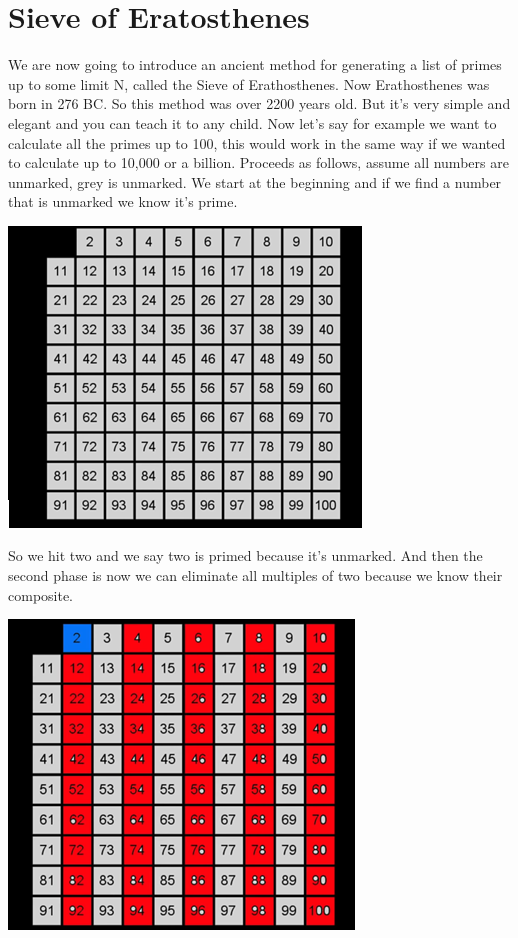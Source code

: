 \documentclass{report}
\begin{document}
\section{Sieve of Eratosthenes}
We are now going to introduce an ancient method for generating a list of primes up to some limit N, called the Sieve of Erathosthenes. Now Erathosthenes was born in 276 BC. So this method was over 2200 years old. But it's very simple and elegant and you can teach it to any child. Now let's say for example we want to calculate all the primes up to 100, this would work in the same way if we wanted to calculate up to 10,000 or a billion. Proceeds as follows, assume all numbers are unmarked, grey is unmarked. We start at the beginning and if we find a number that is unmarked we know it's prime. 
\begin{center}
	\includegraphics[scale=1]{48.png}
\end{center}
So we hit two and we say two is primed because it's unmarked. And then the second phase is now we can eliminate all multiples of two because we know their composite.
\begin{center}
	\includegraphics[scale=1]{49.png}
\end{center}
\end{document}
